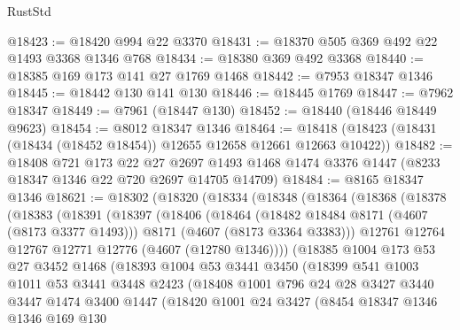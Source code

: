 \begin{lexlean}{RustStd}
\begin{coremodule}
@18423 := @18420 @994 @22 @3370
@18431 := @18370 @505 @369 @492 @22 @1493 @3368 @1346 @768
@18434 := @18380 @369 @492 @3368
@18440 := @18385 @169 @173 @141 @27 @1769 @1468
@18442 := @7953 @18347 @1346
@18445 := @18442 @130 @141 @130
@18446 := @18445 @1769
@18447 := @7962 @18347
@18449 := @7961 (@18447 @130)
@18452 := @18440 (@18446 @18449 @9623)
@18454 := @8012 @18347 @1346
@18464 := @18418 (@18423 (@18431 (@18434 (@18452 @18454)) @12655 @12658 @12661 @12663 @10422))
@18482 := @18408
    @721
    @173
    @22
    @27
    @2697
    @1493
    @1468
    @1474
    @3376
    @1447
    (@8233 @18347 @1346 @22 @720 @2697 @14705 @14709)
@18484 := @8165 @18347 @1346
@18621 := @18302
    (@18320
      (@18334
        (@18348
          (@18364
            (@18368
              (@18378
                (@18383
                  (@18391
                    (@18397
                      (@18406
                        (@18464
                          (@18482 @18484 @8171 (@4607 (@8173 @3377 @1493)))
                          @8171
                          (@4607 (@8173 @3364 @3383)))
                        @12761
                        @12764
                        @12767
                        @12771
                        @12776
                        (@4607 (@12780 @1346))))
                    (@18385
                      @1004
                      @173
                      @53
                      @27
                      @3452
                      @1468
                      (@18393
                        @1004
                        @53
                        @3441
                        @3450
                        (@18399
                          @541
                          @1003
                          @1011
                          @53
                          @3441
                          @3448
                          @2423
                          (@18408
                            @1001
                            @796
                            @24
                            @28
                            @3427
                            @3440
                            @3447
                            @1474
                            @3400
                            @1447
                            (@18420
                              @1001
                              @24
                              @3427
                              (@8454
                                @18347
                                @1346
                                @1346
                                @169
                                @130

\end{coremodule}
\end{lexlean}
